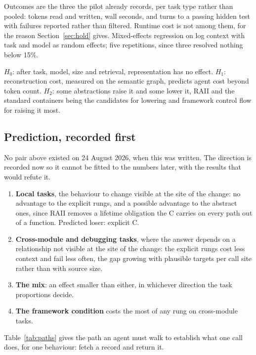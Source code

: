 \documentclass[11pt,a4paper]{article}
\begin{document}
Outcomes are the three the pilot already records, per task type rather than pooled: tokens read and written, wall seconds, and turns to a passing hidden test with failures reported rather than filtered. Runtime cost is not among them, for the reason Section~\ref{sec:hold} gives. Mixed-effects regression on log context with task and model as random effects; five repetitions, since three resolved nothing below 15\%.

$H_0$: after task, model, size and retrieval, representation has no effect. $H_1$: reconstruction cost, measured on the semantic graph, predicts agent cost beyond token count. $H_2$: some abstractions raise it and some lower it, RAII and the standard containers being the candidates for lowering and framework control flow for raising it most.

\subsection{Prediction, recorded first}

No pair above existed on 24 August 2026, when this was written. The direction is recorded now so it cannot be fitted to the numbers later, with the results that would refute it.

\begin{enumerate}[nosep]
\item \textbf{Local tasks}, the behaviour to change visible at the site of the change: no advantage to the explicit rungs, and a possible advantage to the abstract ones, since RAII removes a lifetime obligation the C carries on every path out of a function. Predicted loser: explicit C.
\item \textbf{Cross-module and debugging tasks}, where the answer depends on a relationship not visible at the site of the change: the explicit rungs cost less context and fail less often, the gap growing with plausible targets per call site rather than with source size.
\item \textbf{The mix}: an effect smaller than either, in whichever direction the task proportions decide.
\item \textbf{The framework condition} costs the most of any rung on cross-module tasks.
\end{enumerate}

Table~\ref{tab:paths} gives the path an agent must walk to establish what one call does, for one behaviour: fetch a record and return it.
\end{document}

